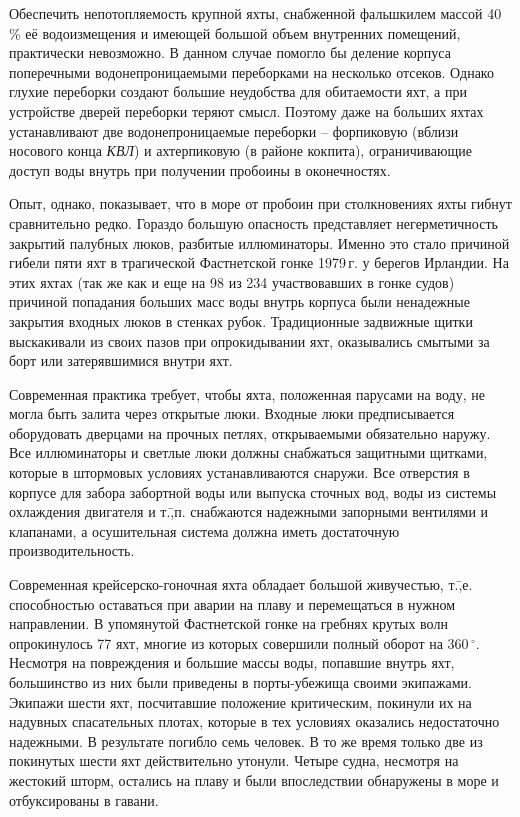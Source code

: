 \documentclass[a4paper, 12pt, twoside, final, book, russian, fittopage, cyremdash]{ncc}
\newcommand{\gr}{\ensuremath{\,^\circ}\xspace}
\begin{document}
Обеспечить непотопляемость крупной яхты, снабженной фальшкилем массой 40\,\% её водоизмещения и имеющей большой объем внутренних помещений, практически невозможно. В данном случае помогло бы деление корпуса поперечными водонепроницаемыми переборками на несколько отсеков. Однако глухие переборки создают большие неудобства для обитаемости яхт, а при устройстве дверей переборки теряют смысл. Поэтому даже на больших яхтах устанавливают две водонепроницаемые переборки \--- форпиковую (вблизи носового конца \textit{КВЛ}) и ахтерпиковую (в районе кокпита), ограничивающие доступ воды внутрь при получении пробоины в оконечностях. 

Опыт, однако, показывает, что в море от пробоин при столкновениях яхты гибнут сравнительно редко. Гораздо большую опасность представляет негерметичность закрытий палубных люков, разбитые иллюминаторы. Именно это стало причиной гибели пяти яхт в трагической Фастнетской гонке 1979\,г. у берегов Ирландии. На этих яхтах (так же как и еще на 98 из 234 участвовавших в гонке судов) причиной попадания больших масс воды внутрь корпуса были ненадежные закрытия входных люков в стенках рубок. Традиционные задвижные щитки выскакивали из своих пазов при опрокидывании яхт, оказывались смытыми за борт или затерявшимися внутри яхт.

Современная практика требует, чтобы яхта, положенная парусами на воду, не могла быть залита через открытые люки. Входные люки предписывается оборудовать дверцами на прочных петлях, открываемыми обязательно наружу. Все иллюминаторы и светлые люки должны снабжаться защитными щитками, которые в штормовых условиях устанавливаются снаружи. Все отверстия в корпусе для забора забортной воды или выпуска сточных вод, воды из системы охлаждения двигателя и т.\=,п. снабжаются надежными запорными вентилями и клапанами, а осушительная система должна иметь достаточную производительность.

Современная крейсерско-гоночная яхта обладает большой живучестью, т.\=,е. способностью оставаться при аварии на плаву и перемещаться в нужном направлении. В упомянутой Фастнетской гонке на гребнях крутых волн опрокинулось 77 яхт, многие из которых совершили полный оборот на 360\gr. Несмотря на повреждения и большие массы воды, попавшие внутрь яхт, большинство из них были приведены в порты-убежища своими экипажами. Экипажи шести яхт, посчитавшие положение критическим, покинули их на надувных спасательных плотах, которые в тех условиях оказались недостаточно надежными. В результате погибло семь человек. В то же время только две из покинутых шести яхт действительно утонули. Четыре судна, несмотря на жестокий шторм, остались на плаву и были впоследствии обнаружены в море и отбуксированы в гавани.
\end{document}
